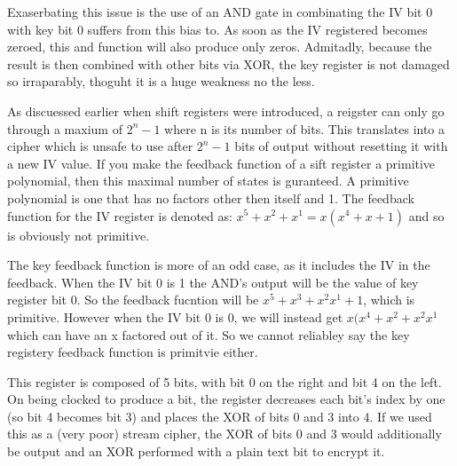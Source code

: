 \documentclass{report}
\begin{document}
Exaserbating this issue is the use of an AND gate in combinating the IV bit 0 with key bit 0 suffers from this bias to. As soon as the IV registered becomes zeroed, this and function will also produce only zeros. Admitadly, because the result is then combined with other bits via XOR, the key register is not damaged so irraparably, thoguht it is a huge weakness no the less.

As discuessed earlier when shift registers were introduced, a reigster can only go through a maxium of $2^n-1$ where n is its number of bits. This translates into a cipher which is unsafe to use after $2^n-1$ bits of output without resetting it with a new IV value. If you make the feedback function of a sift register a primitive polynomial, then this maximal number of states is guranteed. A primitive polynomial is one that has no factors other then itself and 1. The feedback function for the IV register is denoted as: $x^5+x^2+x^1=x(x^4+x+1)$ and so is obviously not primitive.

The key feedback function is more of an odd case, as it includes the IV in the feedback. When the IV bit 0 is 1 the AND's output will be the value of key register bit 0. So the feedback fucntion will be $x^5+x^3+x^2x^1+1$, which is primitive. However when the IV bit 0 is 0, we will instead get $x(x^4+x^2+x^2x^1$ which can have an x factored out of it. So we cannot reliabley say the key registery feedback function is primitvie either.


\begin{figure}[h]
\end{figure}


This register is composed of 5 bits, with bit 0 on the right and bit 4 on the left. On being clocked to produce a bit, the register decreases each bit's index by one (so bit 4 becomes bit 3) and places the XOR of bits 0 and 3 into 4. If we used this as a (very poor) stream cipher, the XOR of bits 0 and 3 would additionally be output and an XOR performed with a plain text bit to encrypt it.
\end{document}
